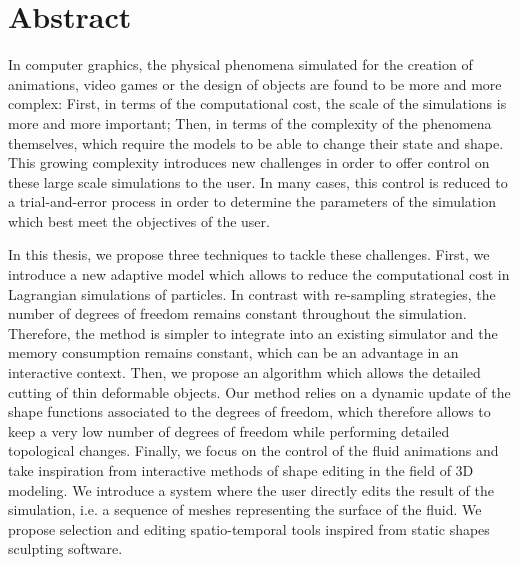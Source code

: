 \chapter{Abstract}

In computer graphics, the physical phenomena simulated for the creation of animations, video games or the design of objects are found to be more and more complex:
First, in terms of the computational cost, the scale of the simulations is more and more important;
Then, in terms of the complexity of the phenomena themselves, which require the models to be able to change their state and shape.
This growing complexity introduces new challenges in order to offer control on these large scale simulations to the user.
In many cases, this control is reduced to a trial-and-error process in order to determine the parameters of the simulation which best meet the objectives of the user.

In this thesis, we propose three techniques to tackle these challenges.
First, we introduce a new adaptive model which allows to reduce the computational cost in Lagrangian simulations of particles.
In contrast with re-sampling strategies, the number of degrees of freedom remains constant throughout the simulation.
Therefore, the method is simpler to integrate into an existing simulator and the memory consumption remains constant, which can be an advantage in an interactive context.
Then, we propose an algorithm which allows the detailed cutting of thin deformable objects.
Our method relies on a dynamic update of the shape functions associated to the degrees of freedom, which therefore allows to keep a very low number of degrees of freedom while performing detailed topological changes.
Finally, we focus on the control of the fluid animations and take inspiration from interactive methods of shape editing in the field of 3D modeling.
We introduce a system where the user directly edits the result of the simulation, i.e. a sequence of meshes representing the surface of the fluid.
We propose selection and editing spatio-temporal tools inspired from static shapes sculpting software.
